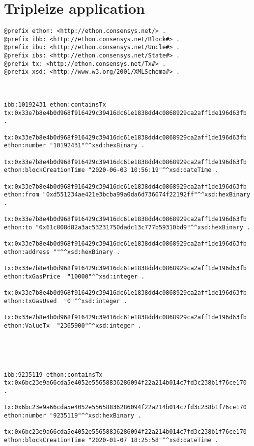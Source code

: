 
\chapter{Tripleize application}
\small
\vspace{0.2in}
\begin{lstlisting}
@prefix ethon: <http://ethon.consensys.net/> .
@prefix ibb: <http://ethon.consensys.net/Block#> .
@prefix ibu: <http://ethon.consensys.net/Uncle#> .
@prefix ibs: <http://ethon.consensys.net/State#> .
@prefix tx: <http://ethon.consensys.net/Tx#> .
@prefix xsd: <http://www.w3.org/2001/XMLSchema#> .



ibb:10192431 ethon:containsTx tx:0x33e7b8e4b0d968f916429c39416dc61e1838dd4c0868929ca2aff1de196d63fb .

tx:0x33e7b8e4b0d968f916429c39416dc61e1838dd4c0868929ca2aff1de196d63fb  ethon:number "10192431"^^xsd:hexBinary .

tx:0x33e7b8e4b0d968f916429c39416dc61e1838dd4c0868929ca2aff1de196d63fb  ethon:blockCreationTime "2020-06-03 10:56:19"^^xsd:dateTime .

tx:0x33e7b8e4b0d968f916429c39416dc61e1838dd4c0868929ca2aff1de196d63fb  ethon:from "0xd551234ae421e3bcba99a0da6d736074f22192ff"^^xsd:hexBinary .

tx:0x33e7b8e4b0d968f916429c39416dc61e1838dd4c0868929ca2aff1de196d63fb  ethon:to "0x61c808d82a3ac53231750dadc13c777b59310bd9"^^xsd:hexBinary .

tx:0x33e7b8e4b0d968f916429c39416dc61e1838dd4c0868929ca2aff1de196d63fb  ethon:address ""^^xsd:hexBinary .

tx:0x33e7b8e4b0d968f916429c39416dc61e1838dd4c0868929ca2aff1de196d63fb  ethon:txGasPrice  "10000"^^xsd:integer .

tx:0x33e7b8e4b0d968f916429c39416dc61e1838dd4c0868929ca2aff1de196d63fb  ethon:txGasUsed  "0"^^xsd:integer .

tx:0x33e7b8e4b0d968f916429c39416dc61e1838dd4c0868929ca2aff1de196d63fb  ethon:ValueTx  "2365900"^^xsd:integer .





ibb:9235119 ethon:containsTx tx:0x6bc23e9a66cda5e4052e55658836286094f22a214b014c7fd3c238b1f76ce170 .

tx:0x6bc23e9a66cda5e4052e55658836286094f22a214b014c7fd3c238b1f76ce170  ethon:number "9235119"^^xsd:hexBinary .

tx:0x6bc23e9a66cda5e4052e55658836286094f22a214b014c7fd3c238b1f76ce170  ethon:blockCreationTime "2020-01-07 18:25:58"^^xsd:dateTime .


\end{lstlisting}
